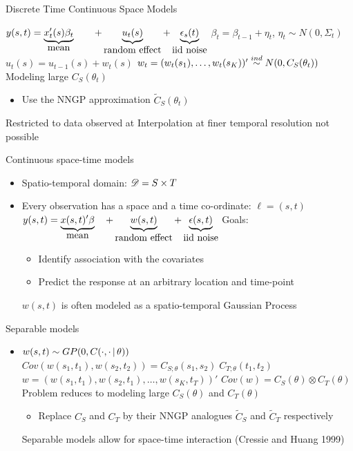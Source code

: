 \begin{frame}{Discrete Time Continuous Space Models}

\begin{itemize}  
\myitem $y(s,t) = \underbrace{x_t'(s)\beta_t}_{\mbox{mean}} \qquad + \underbrace{u_t(s)}_{\mbox{{random effect}}} + \underbrace{\epsilon_s(t)}_{\mbox{iid  noise}}$
\myitem $\beta_t =\beta_{t-1}+\eta_t$, $\eta_t \sim N(0,\Sigma_t)$
\myitem $u_t(s) = u_{t-1}(s)+w_t(s)$
\myitem $w_t = (w_t(s_1),\ldots,w_t(s_K))' \overset{ind}{\sim} N(0,C_S(\theta_t))$
\pause
\myitem Modeling large $C_S(\theta_t)$
\begin{itemize}
\item Use the NNGP approximation $\tilde C_S(\theta_t)$
\end{itemize}
\myitem Restricted to data observed at 
\myitem Interpolation at finer temporal resolution not possible
\end{itemize}
\end{frame}

\begin{frame}{Continuous space-time models}
	\begin{itemize}
		\item Spatio-temporal domain: ${\cal D} = S \times T$
		\item Every observation has a space and a time co-ordinate: $\ell = (s,t)$
		\myitem $y(s,t) = \underbrace{x(s,t)'\beta}_{\mbox{mean}} \quad + \underbrace{w(s,t)}_{\mbox{random effect}} + \underbrace{\epsilon(s,t)}_{\mbox{iid  noise}}$ 
		\pause
		\myitem Goals: 
		\begin{itemize}
			\item Identify association with the covariates
			\item Predict the response at an arbitrary location and time-point
		\end{itemize}
	    \myitem $w(s,t)$ is often modeled as a spatio-temporal Gaussian Process		
	\end{itemize}
\end{frame}

\begin{frame}{Separable models}
	\begin{itemize}
		\item $w(s,t) \sim GP(0, C(\cdot, \cdot \,|\, \theta))$
		\myitem $Cov(w(s_1,t_1),w(s_2,t_2)) = C_{S;\theta}(s_1,s_2)\;C_{T;\theta}(t_1,t_2) \; $
		\myitem $w=(w(s_1,t_1),w(s_2,t_1),\ldots,w(s_K,t_T))'$
		\myitem $Cov(w) = C_S(\theta) \otimes C_T(\theta)$
		\myitem Problem reduces to modeling large $C_S(\theta)$ and $C_T(\theta)$
		\begin{itemize}
			\item Replace $C_S$ and $C_T$ by their NNGP analogues $\tilde C_S$ and $\tilde C_T$ respectively
		\end{itemize}
	\myitem Separable models  allow for space-time interaction (Cressie and Huang 1999)
	\end{itemize}
\end{frame}

